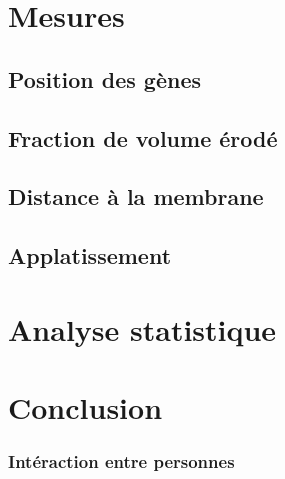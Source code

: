 \documentclass{beamer}
\begin{document}
\section{Mesures}
    
  \subsection{Position des gènes}
    
    \frame
    {
      \frametitle{}
    }
    
  \subsection{Fraction de volume érodé}
    
    \frame
    {
      \frametitle{}
    }
    
  \subsection{Distance à la membrane}
    
    \frame
    {
      \frametitle{}
    }
    
  \subsection{Applatissement}
    
    \frame
    {
      \frametitle{}
    }
    
\section{Analyse statistique}
  
  \frame
  {
    \frametitle{}
  }
  
  
\section*{Conclusion}
  
  \frame
  {
    \frametitle{Intéraction entre personnes}
  }
  
\end{document}
